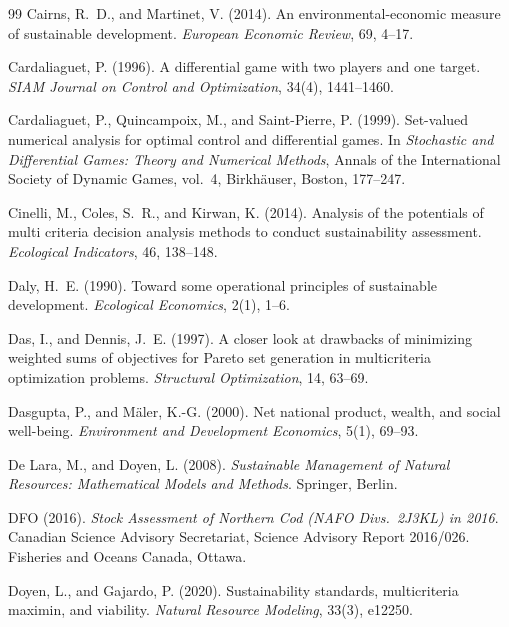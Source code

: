 \begin{thebibliography}{99}
 Cairns, R.~D., and Martinet, V. (2014). An environmental-economic measure of sustainable development. \emph{European Economic Review}, 69, 4--17.

 Cardaliaguet, P. (1996). A differential game with two players and one target. \emph{SIAM Journal on Control and Optimization}, 34(4), 1441--1460.

 Cardaliaguet, P., Quincampoix, M., and Saint-Pierre, P. (1999). Set-valued numerical analysis for optimal control and differential games. In \emph{Stochastic and Differential Games: Theory and Numerical Methods}, Annals of the International Society of Dynamic Games, vol.~4, Birkh\"auser, Boston, 177--247.

 Cinelli, M., Coles, S.~R., and Kirwan, K. (2014). Analysis of the potentials of multi criteria decision analysis methods to conduct sustainability assessment. \emph{Ecological Indicators}, 46, 138--148.

 Daly, H.~E. (1990). Toward some operational principles of sustainable development. \emph{Ecological Economics}, 2(1), 1--6.

 Das, I., and Dennis, J.~E. (1997). A closer look at drawbacks of minimizing weighted sums of objectives for Pareto set generation in multicriteria optimization problems. \emph{Structural Optimization}, 14, 63--69.

 Dasgupta, P., and M\"aler, K.-G. (2000). Net national product, wealth, and social well-being. \emph{Environment and Development Economics}, 5(1), 69--93.

 De Lara, M., and Doyen, L. (2008). \emph{Sustainable Management of Natural Resources: Mathematical Models and Methods}. Springer, Berlin.

 DFO (2016). \emph{Stock Assessment of Northern Cod (NAFO Divs.\ 2J3KL) in 2016}. Canadian Science Advisory Secretariat, Science Advisory Report 2016/026. Fisheries and Oceans Canada, Ottawa.

 Doyen, L., and Gajardo, P. (2020). Sustainability standards, multicriteria maximin, and viability. \emph{Natural Resource Modeling}, 33(3), e12250.


\end{thebibliography}
